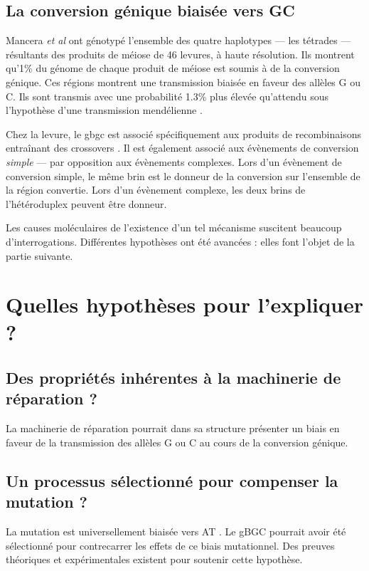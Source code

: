 \documentclass[11pt, oneside]{scrartcl}
\begin{document}
\subsection{La conversion génique biaisée vers GC}
\label{sec:orgheadline7}


Mancera \emph{et al} \cite{mancera_high-resolution_2008} ont génotypé l'ensemble des
quatre haplotypes --- les tétrades --- résultants des produits de méiose de 46
levures, à haute résolution. Ils montrent qu'1\% du génome de chaque produit de
méiose est soumis à de la conversion génique. Ces régions montrent une
transmission biaisée en faveur des allèles G ou C. Ils sont transmis avec une
probabilité 1.3\% plus élevée qu'attendu sous l'hypothèse d'une transmission
mendélienne \cite{mancera_high-resolution_2008}. 

Chez la levure, le \ac{gbgc} est associé spécifiquement aux produits de
recombinaisons entraînant des crossovers \cite{lesecque_gc-biased_2013}. Il est
également associé aux évènements de conversion \emph{simple} --- par opposition aux
évènements complexes. Lors d'un évènement de conversion simple, le même brin est
le donneur de la conversion sur l'ensemble de la région convertie. Lors d'un
évènement complexe, les deux brins de l'hétéroduplex peuvent être donneur. 

\begin{transition}
  Les causes moléculaires de l'existence d'un tel mécanisme suscitent beaucoup
  d'interrogations. Différentes hypothèses ont été avancées : elles font l'objet
  de la partie suivante. 
\end{transition}

\section{Quelles hypothèses pour l'expliquer ?}
\label{sec:orgheadline11}
\subsection{Des propriétés inhérentes à la machinerie de réparation ?}
\label{sec:orgheadline9}
La machinerie de réparation pourrait dans sa structure présenter un biais en
faveur de la transmission des allèles G ou C au cours de la conversion génique. 
\subsection{Un processus sélectionné pour compenser la mutation ?}
\label{sec:orgheadline10}
La mutation est universellement biaisée vers AT \cite{lynch_TODO_2010}. Le gBGC
pourrait avoir été sélectionné pour contrecarrer les effets de ce biais
mutationnel. Des preuves théoriques et expérimentales existent pour soutenir
cette hypothèse. 
\end{document}
